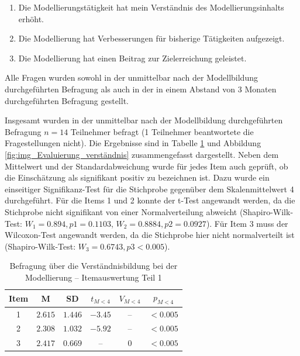 \begin{enumerate}
	\item Die Modellierungstätigkeit hat mein Verständnis des Modellierungsinhalts erhöht.
	\item Die Modellierung hat Verbesserungen für bisherige Tätigkeiten aufgezeigt.
	\item Die Modellierung hat einen Beitrag zur Zielerreichung geleistet.
\end{enumerate}

Alle Fragen wurden sowohl in der unmittelbar nach der Modellbildung durchgeführten Befragung als auch in der in einem Abstand von 3 Monaten durchgeführten Befragung gestellt.

Insgesamt wurden in der unmittelbar nach der Modellbildung durchgeführten Befragung $n=14$ Teilnehmer befragt (1 Teilnehmer beantwortete die Fragestellungen nicht). Die Ergebnisse sind in Tabelle \ref{tab:verständnis} und Abbildung \ref{fig:img_Evaluierung_verständnis} zusammengefasst dargestellt. Neben dem Mittelwert und der Standardabweichung wurde für jedes Item auch geprüft, ob die Einschätzung als signifikant positiv zu bezeichnen ist. Dazu wurde ein einseitiger Signifikanz-Test für die Stichprobe gegenüber dem Skalenmittelwert 4 durchgeführt. Für die Items 1 und 2 konnte der t-Test angewandt werden, da die Stichprobe nicht signifikant von einer Normalverteilung abweicht (Shapiro-Wilk-Test: $W_{1}=0.894, p{1}=0.1103$, $W_{2}=0.8884, p{2}=0.0927$). Für Item 3 muss der Wilcoxon-Test angewandt werden, da die Stichprobe hier nicht normalverteilt ist (Shapiro-Wilk-Test: $W_{3}=0.6743, p{3}<0.005$).

\begin{table}[htbp]
	\centering
	\caption{Befragung über die Verständnisbildung bei der Modellierung -- Itemauswertung Teil 1}

\begin{tabular}{| c || c | c || c | c | c |}
  \hline
   Item & M & SD & $t_{M<4}$ & $V_{M<4}$ & $p_{M<4}$ \\ \hline
   1  & $2.615$ & $1.446$ & $-3.45$ & -- & $<0.005$ \\ 
   2  & $2.308$ & $1.032$ & $-5.92$ & -- & $<0.005$ \\ 
   3  & $2.417$ & $0.669$ & -- & $0$ & $<0.005$ \\ \hline
\end{tabular} \\ 
	\label{tab:verständnis}
\end{table}


